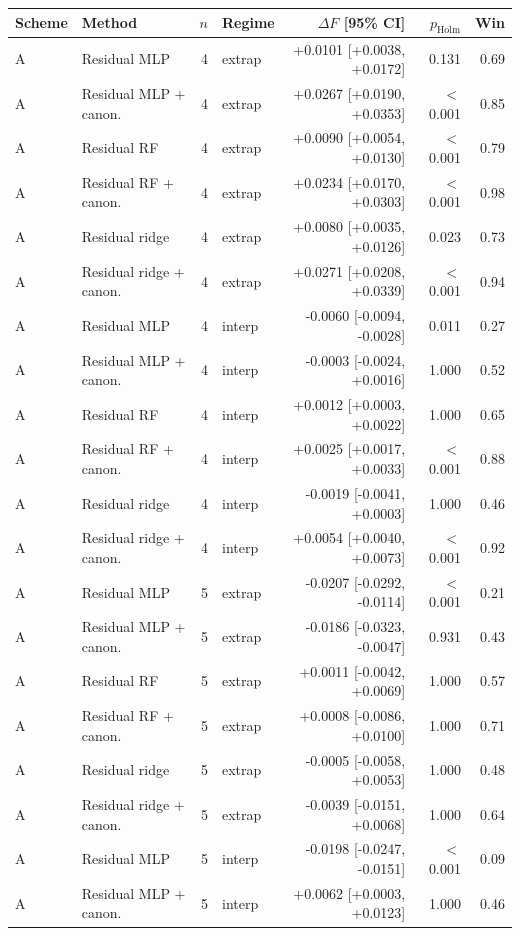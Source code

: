 \begin{longtable}{llrlrrr}
\toprule
Scheme & Method & $n$ & Regime & $\Delta F$ [95\% CI] & $p_{\mathrm{Holm}}$ & Win \\
\midrule
\endhead
A & Residual MLP & 4 & extrap & +0.0101 [+0.0038, +0.0172] & 0.131 & 0.69 \\
A & Residual MLP + canon. & 4 & extrap & +0.0267 [+0.0190, +0.0353] & $<$0.001 & 0.85 \\
A & Residual RF & 4 & extrap & +0.0090 [+0.0054, +0.0130] & $<$0.001 & 0.79 \\
A & Residual RF + canon. & 4 & extrap & +0.0234 [+0.0170, +0.0303] & $<$0.001 & 0.98 \\
A & Residual ridge & 4 & extrap & +0.0080 [+0.0035, +0.0126] & 0.023 & 0.73 \\
A & Residual ridge + canon. & 4 & extrap & +0.0271 [+0.0208, +0.0339] & $<$0.001 & 0.94 \\
A & Residual MLP & 4 & interp & -0.0060 [-0.0094, -0.0028] & 0.011 & 0.27 \\
A & Residual MLP + canon. & 4 & interp & -0.0003 [-0.0024, +0.0016] & 1.000 & 0.52 \\
A & Residual RF & 4 & interp & +0.0012 [+0.0003, +0.0022] & 1.000 & 0.65 \\
A & Residual RF + canon. & 4 & interp & +0.0025 [+0.0017, +0.0033] & $<$0.001 & 0.88 \\
A & Residual ridge & 4 & interp & -0.0019 [-0.0041, +0.0003] & 1.000 & 0.46 \\
A & Residual ridge + canon. & 4 & interp & +0.0054 [+0.0040, +0.0073] & $<$0.001 & 0.92 \\
A & Residual MLP & 5 & extrap & -0.0207 [-0.0292, -0.0114] & $<$0.001 & 0.21 \\
A & Residual MLP + canon. & 5 & extrap & -0.0186 [-0.0323, -0.0047] & 0.931 & 0.43 \\
A & Residual RF & 5 & extrap & +0.0011 [-0.0042, +0.0069] & 1.000 & 0.57 \\
A & Residual RF + canon. & 5 & extrap & +0.0008 [-0.0086, +0.0100] & 1.000 & 0.71 \\
A & Residual ridge & 5 & extrap & -0.0005 [-0.0058, +0.0053] & 1.000 & 0.48 \\
A & Residual ridge + canon. & 5 & extrap & -0.0039 [-0.0151, +0.0068] & 1.000 & 0.64 \\
A & Residual MLP & 5 & interp & -0.0198 [-0.0247, -0.0151] & $<$0.001 & 0.09 \\
A & Residual MLP + canon. & 5 & interp & +0.0062 [+0.0003, +0.0123] & 1.000 & 0.46 \\

\end{longtable}
